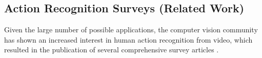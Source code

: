 %
%
%
%
%
%
%
%
%
%
%
%
%
%
%
%
%
%
%
\subsection{Action Recognition Surveys (Related Work)}
\label{sec:relatedwork}

Given the large number of possible applications, the computer vision community has shown an increased interest in human action recognition from video, which resulted in the publication of several comprehensive survey articles
\cite{poppe_survey_2010, aggarwal_human_2011, chaquet_survey_2013, langkvist_review_2014, herath_going_2016, kang_review_2016}.

